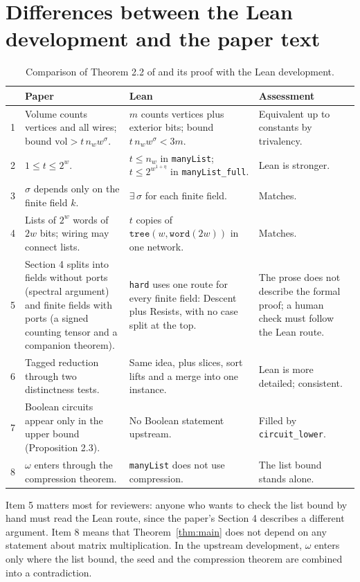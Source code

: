 \documentclass[11pt]{amsart}
\theoremstyle{definition}
\theoremstyle{remark}
\newcommand{\lean}[1]{\texttt{#1}}
\begin{document}
\section{Differences between the Lean development and the paper text}\label{sec:diff}

\begin{table}[h]
\small
\begin{tabularx}{\textwidth}{@{}lXXX@{}}
\toprule
 & Paper \cite{OAI94} & Lean \cite{OAImath} & Assessment\\
\midrule
1 & Volume counts vertices and all wires; bound $\mathrm{vol}>t\,n_w w^{\sigma}$. & $m$ counts vertices plus exterior bits; bound $t\,n_w w^{\sigma}<3m$. & Equivalent up to constants by trivalency.\\
2 & $1\le t\le 2^w$. & $t\le n_w$ in \lean{manyList}; $t\le 2^{w^{1+\eta}}$ in \lean{manyList\_full}. & Lean is stronger.\\
3 & $\sigma$ depends only on the finite field $k$. & $\exists\,\sigma$ for each finite field. & Matches.\\
4 & Lists of $2^w$ words of $2w$ bits; wiring may connect lists. & $t$ copies of $\mathtt{tree}(w,\mathtt{word}(2w))$ in one network. & Matches.\\
5 & Section 4 splits into fields without ports (spectral argument) and finite fields with ports (a signed counting tensor and a companion theorem). & \lean{hard} uses one route for every finite field: Descent plus Resists, with no case split at the top. & The prose does not describe the formal proof; a human check must follow the Lean route.\\
6 & Tagged reduction through two distinctness tests. & Same idea, plus slices, sort lifts and a merge into one instance. & Lean is more detailed; consistent.\\
7 & Boolean circuits appear only in the upper bound (Proposition 2.3). & No Boolean statement upstream. & Filled by \lean{circuit\_lower}.\\
8 & $\omega$ enters through the compression theorem. & \lean{manyList} does not use compression. & The list bound stands alone.\\
\bottomrule
\end{tabularx}
\caption{Comparison of Theorem 2.2 of \cite{OAI94} and its proof with the Lean development.}
\end{table}

Item 5 matters most for reviewers: anyone who wants to check the list bound by hand must read the Lean route, since the paper's Section 4 describes a different argument. Item 8 means that Theorem~\ref{thm:main} does not depend on any statement about matrix multiplication. In the upstream development, $\omega$ enters only where the list bound, the seed and the compression theorem are combined into a contradiction.
\end{document}
